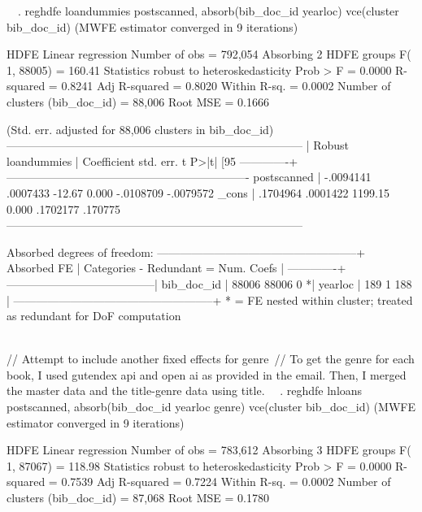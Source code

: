 {\
\
. reghdfe loandummies postscanned, absorb(bib_doc_id yearloc) vce(cluster bib_doc_id)
(MWFE estimator converged in 9 iterations)

HDFE Linear regression                            Number of obs   =    792,054
Absorbing 2 HDFE groups                           F(   1,  88005) =     160.41
Statistics robust to heteroskedasticity           Prob > F        =     0.0000
                                                  R-squared       =     0.8241
                                                  Adj R-squared   =     0.8020
                                                  Within R-sq.    =     0.0002
Number of clusters (bib_doc_id) =     88,006      Root MSE        =     0.1666

                        (Std. err. adjusted for 88,006 clusters in bib_doc_id)
------------------------------------------------------------------------------
             |               Robust
 loandummies | Coefficient  std. err.      t    P>|t|     [95%
-------------+----------------------------------------------------------------
 postscanned |  -.0094141   .0007433   -12.67   0.000    -.0108709   -.0079572
       _cons |   .1704964   .0001422  1199.15   0.000     .1702177     .170775
------------------------------------------------------------------------------

Absorbed degrees of freedom:
-----------------------------------------------------+
 Absorbed FE | Categories  - Redundant  = Num. Coefs |
-------------+---------------------------------------|
  bib_doc_id |     88006       88006           0    *|
     yearloc |       189           1         188     |
-----------------------------------------------------+
* = FE nested within cluster; treated as redundant for DoF computation

\\
// Attempt to include another fixed effects for genre\
// To get the genre for each book, I used gutendex api and open ai as provided in the email. Then, I merged the master data and the title-genre data using title. \
\
. reghdfe lnloans postscanned, absorb(bib_doc_id yearloc genre) vce(cluster bib_doc_id)
(MWFE estimator converged in 9 iterations)

HDFE Linear regression                            Number of obs   =    783,612
Absorbing 3 HDFE groups                           F(   1,  87067) =     118.98
Statistics robust to heteroskedasticity           Prob > F        =     0.0000
                                                  R-squared       =     0.7539
                                                  Adj R-squared   =     0.7224
                                                  Within R-sq.    =     0.0002
Number of clusters (bib_doc_id) =     87,068      Root MSE        =     0.1780

}
